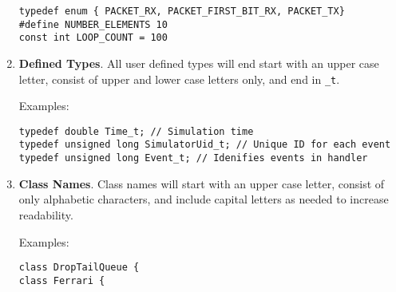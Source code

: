 \documentclass[11pt]{article}
\begin{document}
\begin{enumerate}
{\tt typedef enum \{ PACKET\_RX, PACKET\_FIRST\_BIT\_RX, PACKET\_TX\} }\\
{\tt \#define NUMBER\_ELEMENTS 10}\\
{\tt const int LOOP\_COUNT = 100}

\item {\bf Defined Types}.  All user defined types will end start with
an upper case letter, consist of upper and lower case letters only, and
end in {\tt \_t}.

Examples:

{\tt typedef double         Time\_t;         // Simulation time}\\
{\tt typedef unsigned long  SimulatorUid\_t; // Unique ID for each event}\\
{\tt typedef unsigned long  Event\_t;        // Idenifies events in handler}\\

\item {\bf Class Names}.  Class names will start with an upper case letter,
consist of only alphabetic characters, and include capital letters as 
needed to increase readability.

Examples:

{\tt class DropTailQueue \{}\\
{\tt class Ferrari \{}\\

\end{enumerate}

\end{document}
